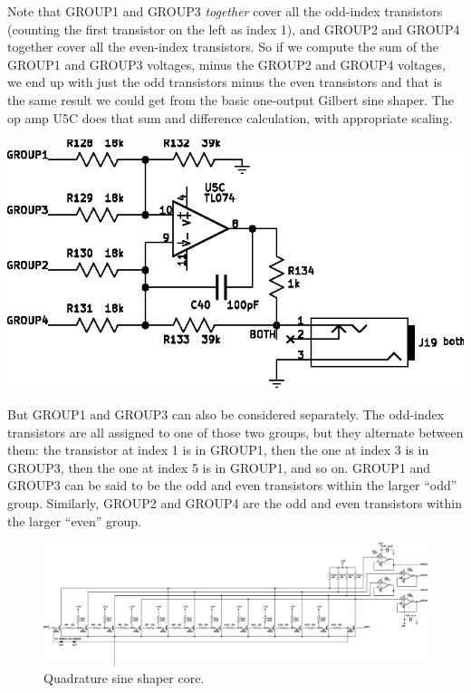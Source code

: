 Note that GROUP1 and GROUP3 \emph{together} cover all the odd-index
transistors (counting the first transistor on the left as index 1), and
GROUP2 and GROUP4 together cover all the even-index transistors.  So if we
compute the sum of the GROUP1 and GROUP3 voltages, minus the GROUP2 and
GROUP4 voltages, we end up with just the odd transistors minus the even
transistors and that is the same result we could get from the basic
one-output Gilbert sine shaper.  The op amp U5C does that sum and difference
calculation, with appropriate scaling.

\noindent\includegraphics[width=\linewidth]{sh-outmix-both}

But GROUP1 and GROUP3 can also be considered separately.  The odd-index
transistors are all assigned to one of those two groups, but they
alternate between them:  the transistor at index 1 is in GROUP1, then the
one at index 3 is in GROUP3, then the one at index 5 is in GROUP1, and so
on.  GROUP1 and GROUP3 can be said to be the odd and even transistors within
the larger ``odd'' group.  Similarly, GROUP2 and GROUP4 are the odd and even
transistors within the larger ``even'' group.

\begin{figure}
\centering\includegraphics[width=\linewidth]{sh-core}\par
\caption{Quadrature sine shaper core.}\label{fig:sh-core}
\end{figure}

